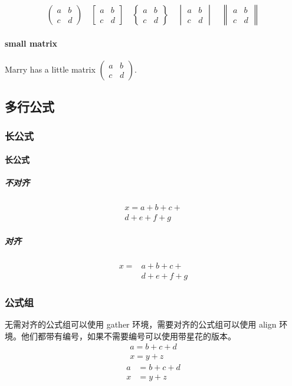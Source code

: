 \documentclass[UTF8]{ctexart}
\begin{document}
\[ \begin{pmatrix}
 a&b\\
 c&d 
 \end{pmatrix} \quad
\begin{bmatrix} a&b\\c&d \end{bmatrix} \quad
\begin{Bmatrix} a&b\\c&d \end{Bmatrix} \quad
\begin{vmatrix} a&b\\c&d \end{vmatrix} \quad
\begin{Vmatrix} a&b\\c&d \end{Vmatrix} 
\]

\paragraph{small matrix}
Marry has a little matrix $ ( \begin{smallmatrix} a&b\\c&d \end{smallmatrix} ) $.

\subsection{多行公式}
\subsubsection{长公式}
\paragraph{长公式}
\subparagraph{不对齐}
\begin{multline}
x = a+b+c+{} \\
d+e+f+g
\end{multline}

\subparagraph{对齐}
\[
\begin{aligned}
x ={}& a+b+c+{} \\
&d+e+f+g
\end{aligned}
\]
\subsubsection{公式组}
无需对齐的公式组可以使用 gather 环境，需要对齐的公式组可以使用 align 环境。他们都带有编号，如果不需要编号可以使用带星花的版本。
\begin{gather}
a = b+c+d \\
x = y+z
\end{gather}
\begin{align}
a &= b+c+d \\
x &= y+z
\end{align}
\end{document}
